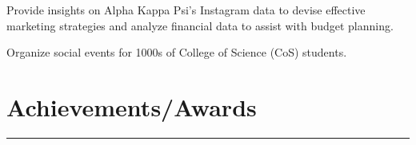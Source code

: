 \documentclass[]{sahana}
\begin{document}
\begin{minipage}[t]{0.66\textwidth}
\vspace{-8pt}
\begin{tightemize}
\item Provide insights on Alpha Kappa Psi's Instagram data to devise effective marketing strategies and analyze financial data to assist with budget planning.
\end{tightemize}
\vspace{1pt}

\vspace{-8pt}
\begin{tightemize}
\item Organize social events for 1000s of College of Science (CoS) students.
\end{tightemize}
\section{Achievements/Awards} 
\noindent\rule{12.5cm}{0.4pt}


\\
\\
\\
\\



\end{minipage} 
\end{document}
